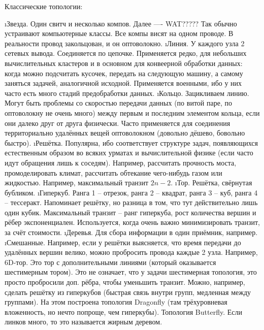  Классические топологии:
 \begin{enumerate}
 	\i Звезда. Один свитч и несколько компов. Далее ---- WAT????? Так обычно устраивают компьютерные классы. Все компы висят на одном проводе. В реальности провод закольцован, и он оптоволокно.
 	\i Линия. У каждого узла 2 сетевых вывода. Соединяется по цепочке.
 	Применяется редко, для небольших вычислительных кластеров и в основном для конвеерной обработки данных: когда можно подсчитать кусочек, передать на следующую машину, а самому заняться задачей, аналогичной исходной.
 	Применяется военными, ибо у них часто есть много стадий предобработки данных.
 	\i Кольцо. Зацикливаем линию. Могут быть проблемы со скоростью передачи данных (по витой паре, по оптоволокну не очень много) между первым и последним элементом кольца, если они далеко друг от друга физически.
 	Часто применяется для соединения территориально удалённых вещей оптоволокном (довольно дёшево, бовольно быстро).
 	\i Решётка. 
 	Популярна, ибо соответствует структуре задач, появляющихся естественным образом во всяких урматах и вычислительной физике (если часто идут обращения лишь к соседям). Например, рассчитать прочность моста, промоделировать климат, рассчитать обтекание чего-нибудь газом или жидкостью.
 	Например, максимальный транзит $2n-2$.
 	\i Тор. Решётка, свёрнутая бубликом.
 	\i Гиперкуб. Ранга 1 -- отрезок, ранга 2 -- квадрат, ранга 3 -- куб, ранга 4 -- тессеракт. Напоминает решётку, но разница в том, что тут действительно лишь один кубик.
 	Максимальный транзит -- ранг гиперкуба, рост количества вершин и рёбер экспоненциален.
 	Используется, когда очень важно минимизировать транзит, за счёт стоимости.
 	\i Деревья. 
 	Для сбора информации в один приёмник, например.
 	\i Смешанные. Например, если у решётки выясняется, что время передачи до удалённых вершин велико, можно пробросить провода каждые 2 узла.
 	Например, 6D-тор. Это тор с дополнительными линиями (который оказывается шестимерным тором). Это не означает, что у задачи шестимерная топология, это просто пробросили доп. рёбра, чтобы уменьшить транзит.
 	Можно, например, сделать решётку из гиперкубов (быстрая связь внутри групп, медленная между группами). На этом построена топология Dragonfly (там трёхуровневая вложенность, но нечто попроще, чем гиперкубы). 
 	Топология Butterfly. Если линков много, то это называется жирным деревом.
 \end{enumerate}

